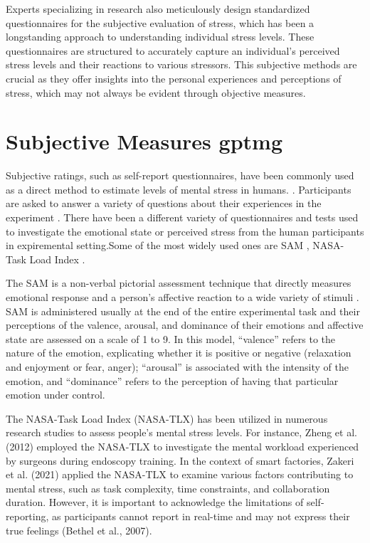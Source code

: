 Experts specializing in research also meticulously design standardized questionnaires for the subjective evaluation of stress, which has been a longstanding approach to understanding individual stress levels. These questionnaires are structured to accurately capture an individual's perceived stress levels and their reactions to various stressors. This subjective methods are crucial as they offer insights into the personal experiences and perceptions of stress, which may not always be evident through objective measures.

\section{Subjective Measures \gls{gptmg}}

Subjective ratings, such as self-report questionnaires, have
been commonly used as a direct method to estimate levels of mental stress in humans.
\parencite{aigram}. Participants are asked to answer a variety of
questions about their experiences in the experiment . There have been a different variety of questionnaires and tests used to investigate the emotional state or perceived stress from the human participants in expiremental setting.Some of the most widely used ones are \gls{SAM} \parencite{SAM}, NASA-Task Load Index \parencite{tlx}.

The \gls{SAM} is a non-verbal pictorial assessment technique that directly measures emotional response and a person's affective reaction to a wide variety of stimuli \parencite{SAM}. \gls{SAM} is administered usually at the end of the entire experimental task and their perceptions of the valence, arousal, and dominance of their emotions and affective state are assessed on a scale of 1 to 9. In this model, “valence” refers to the nature of the emotion, explicating whether it is positive or negative (relaxation and enjoyment or fear, anger); “arousal” is associated with the intensity of the emotion, and “dominance” refers to the perception of having that particular emotion under control.

The NASA-Task Load Index (NASA-TLX) has been utilized in numerous research
studies to assess people’s mental stress levels. For instance, Zheng et al.
(2012) employed the NASA-TLX to investigate the mental workload
experienced by surgeons during endoscopy training. In the context of
smart factories, Zakeri et al. (2021) applied the NASA-TLX to examine
various factors contributing to mental stress, such as task complexity,
time constraints, and collaboration duration. However, it is important to
acknowledge the limitations of self-reporting, as participants cannot
report in real-time and may not express their true feelings (Bethel et al.,
2007). 

